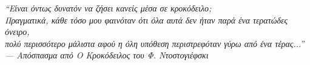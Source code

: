 \thispagestyle{empty}

\vspace*{\fill}

\begin{flushright}
\itshape
``Είναι όντως δυνατόν να ζήσει κανείς μέσα σε κροκόδειλο; \\
Πραγματικά, κάθε τόσο μου φαινόταν ότι όλα αυτά δεν ήταν παρά ένα τερατώδες όνειρο, \\
πολύ περισσότερο μάλιστα αφού η όλη υπόθεση περιστρεφόταν γύρω από ένα τέρας...''\\[0.5cm]
--- Απόσπασμα από \textit{Ο Κροκόδειλος} του Φ. Ντοστογιέφσκι
\end{flushright}

\vspace*{\fill}